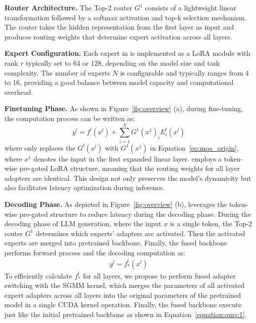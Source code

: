 \noindent\textbf{Router Architecture.} The Top-2 router $G^1$ consists of a lightweight linear transformation followed by a softmax activation and top-k selection mechanism. The router takes the hidden representation from the first layer as input and produces routing weights that determine expert activation across all layers.

\noindent\textbf{Expert Configuration.} Each expert in \sys is implemented as a LoRA module with rank $r$ typically set to 64 or 128, depending on the model size and task complexity. The number of experts $N$ is configurable and typically ranges from 4 to 16, providing a good balance between model capacity and computational overhead.

\noindent\textbf{Finetuning Phase.}
As shown in Figure~\ref{fig:overview} (a), during fine-tuning, the computation process can be written as:
\begin{equation}
    y^l = f^l(x^l) + \sum_{i = 1}^{N}{G^1(x^{1})_iE^l_i(x^l)}
    \label{equation:ours:definition}
\end{equation}
where \sys only replaces the $G^l(x^l)$ with $G^1(x^{1})$ in Equation~\ref{eq:moa_origin}, where $x^{1}$ denotes the input in the first expanded linear layer. \sys employs a token-wise pre-gated LoRA structure, meaning that the routing weights for all layer adapters are identical. 
This design not only preserves the model's dynamicity but also facilitates latency optimization during inference.

\noindent\textbf{Decoding Phase.}
As depicted in Figure~\ref{fig:overview} (b), \sys leverages the token-wise pre-gated structure to reduce latency during the decoding phase. During the decoding phase of LLM generation, where the input \( x \) is a single token, the Top-2 router $G^1$ determines which experts' adapters are activated. 
Then the activated experts are merged into pretrained backbone. Finally, the fused backbone performs forward process and the decoding computation as:
\begin{align}\label{equation:ours:1}
    y^l = f^l_*(x^l)
\end{align}
To efficiently calculate $f^l_*$ for all layers, we propose to perform fused adapter switching with the SGMM kernel, which merges the parameters of all activated expert adapters across all layers into the original parameters of the pretrained model in a single CUDA kernel operation. 
Finally, the fused backbone execute just like the initial pretrained backbone as shown in Equation~\ref{equation:ours:1}.

